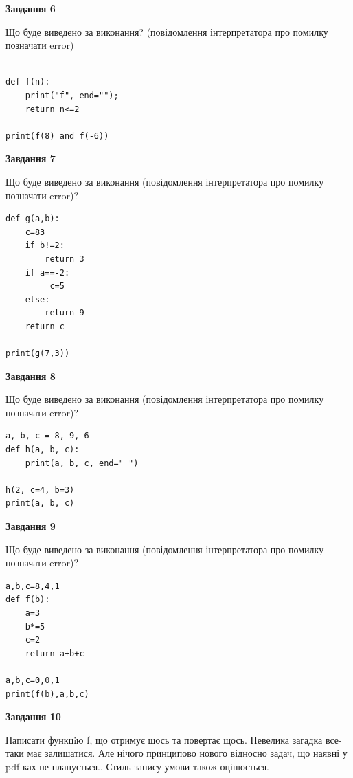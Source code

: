 \documentclass[12pt, ukrainian]{article}
\begin{document}
{\begin {large}
{\begin {center}\textbf{Завдання 6}\end {center}}

Що буде виведено за виконання? (повідомлення інтерпретатора про помилку позначати error)\par
\begin{verbatim}

def f(n):
    print("f", end="");
    return n<=2

print(f(8) and f(-6))
\end{verbatim}

{\begin {center}\textbf{Завдання 7}\end {center}}

Що буде виведено за виконання (повідомлення інтерпретатора про помилку позначати error)?\par
\begin{verbatim}
def g(a,b):
    c=83
    if b!=2:
        return 3
    if a==-2:
         c=5
    else: 
        return 9
    return c

print(g(7,3))
\end{verbatim}

{\begin {center}\textbf{Завдання 8}\end {center}}

Що буде виведено за виконання (повідомлення інтерпретатора про помилку позначати error)?\par
\begin{verbatim}
a, b, c = 8, 9, 6
def h(a, b, c):
    print(a, b, c, end=" ")

h(2, c=4, b=3)
print(a, b, c)
\end{verbatim}

{\begin {center}\textbf{Завдання 9}\end {center}}

Що буде виведено за виконання (повідомлення інтерпретатора про помилку позначати error)?\par
\begin{verbatim}
a,b,c=8,4,1
def f(b):
    a=3
    b*=5
    c=2
    return a+b+c

a,b,c=0,0,1
print(f(b),a,b,c)
\end{verbatim}

{\begin {center}\textbf{Завдання 10}\end {center}}


Написати функцiю f, що отримує щось та повертає щось. Невелика загадка все-таки має залишатися. Але нічого принципово нового відносно задач, що наявні у pdf-ках не планується.. Стиль запису умови також оцінюється.\par
\end {large}}
\newpage
\end{document}
